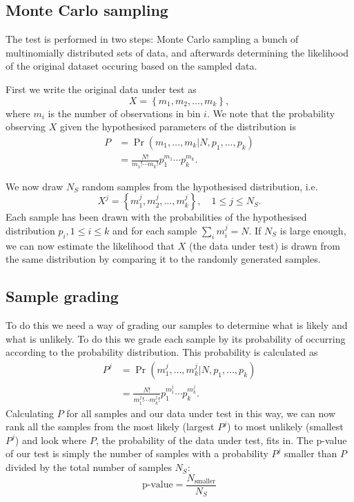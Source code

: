 \documentclass{ol-softwaremanual}
\begin{document}
\subsection{Monte Carlo sampling}

The test is performed in two steps: Monte Carlo sampling a bunch of 
multinomially distributed sets of data, and afterwards determining the 
likelihood of the original dataset occuring based on the sampled data.

First we write the original data under test as
\begin{equation}
X = \left\{ m_1, m_2, \ldots , m_k \right\},
\end{equation}
where $m_i$ is the number of observations in bin $i$. We note that the 
probability observing $X$ given the hypothesised parameters of the distribution 
is
\begin{align}
P &= \Pr\left(m_1, \ldots, m_k | N , p_1, \ldots, p_k\right) \nonumber \\
&= \frac{N!}{m_1! \cdots m_k!} p_1^{m_1} \cdots p_k^{m_k}.
\end{align}

We now draw $N_S$ random samples from the hypothesised distribution, i.e.
\begin{equation}
X^j = \left\{ m_1^j, m_2^j, \ldots, m_k^j \right\},\quad 1\leq j \leq N_S.
\end{equation}
Each sample has been drawn with the probabilities of the hypothesised 
distribution $p_i, 1\leq i\leq k$ and for each sample $\sum_i m_i^j = N$.
If $N_S$ is large enough, we can now estimate the likelihood that $X$ (the data 
under test) is drawn 
from the same distribution by comparing it to the randomly generated samples.

\subsection{Sample grading}

To do this we need a way of grading our samples to determine what is likely and 
what is unlikely. To do this we grade each sample by its 
probability of occurring according to the probability distribution. This 
probability is calculated as
\begin{align}
P^j &= \Pr\left(m^j_1, \ldots, m^j_k | N , p_1, \ldots, p_k\right) \nonumber \\ 
\label{eq:prob}
&= \frac{N!}{m^j_1! \cdots m^j_k!} p_1^{m^j_1} \cdots p_k^{m^j_k}.
\end{align}
Calculating $P$ for all samples and our data under test in this way, we can 
now rank all the samples from the most likely (largest $P^j$) to most unlikely 
(smallest $P^j$) and look where $P$, the probability of the data under test, 
fits 
in. 
The p-value of our test is simply the number of samples with a probability 
$P^j$ smaller than $P$ divided by the total number of samples $N_S$:
\begin{equation}
\textrm{p-value} = \frac{N_{\textrm{smaller}}}{N_S}
\end{equation}
\end{document}
